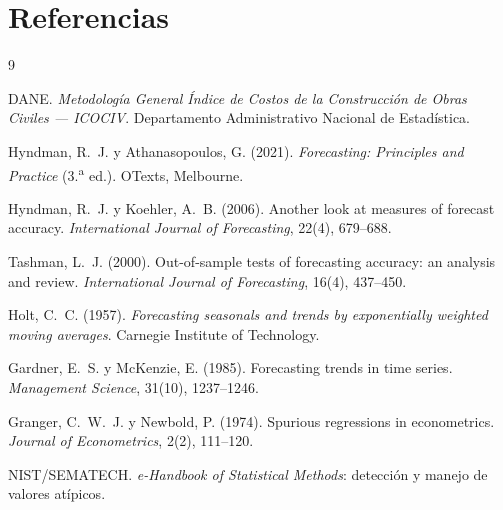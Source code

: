 \documentclass[11pt,letterpaper]{article}
\begin{document}
\section*{Referencias}
\begin{thebibliography}{9}

DANE. \textit{Metodología General Índice de Costos de la Construcción de Obras
Civiles --- ICOCIV}. Departamento Administrativo Nacional de Estadística.

Hyndman, R.~J. y Athanasopoulos, G. (2021). \textit{Forecasting: Principles and
Practice} (3.\textsuperscript{a} ed.). OTexts, Melbourne.

Hyndman, R.~J. y Koehler, A.~B. (2006). Another look at measures of forecast
accuracy. \textit{International Journal of Forecasting}, 22(4), 679--688.

Tashman, L.~J. (2000). Out-of-sample tests of forecasting accuracy: an analysis
and review. \textit{International Journal of Forecasting}, 16(4), 437--450.

Holt, C.~C. (1957). \textit{Forecasting seasonals and trends by exponentially
weighted moving averages}. Carnegie Institute of Technology.

Gardner, E.~S. y McKenzie, E. (1985). Forecasting trends in time series.
\textit{Management Science}, 31(10), 1237--1246.

Granger, C.~W.~J. y Newbold, P. (1974). Spurious regressions in econometrics.
\textit{Journal of Econometrics}, 2(2), 111--120.

NIST/SEMATECH. \textit{e-Handbook of Statistical Methods}: detección y manejo de
valores atípicos.

\end{thebibliography}
\end{document}
